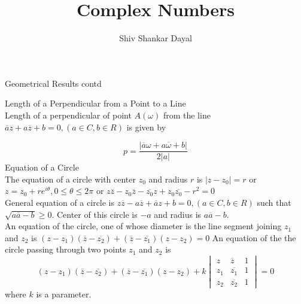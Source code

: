 \documentclass[aspectratio=169,8pt]{beamer}
\title{Complex Numbers}
\author[Shiv Shankar Dayal]{Shiv Shankar Dayal}
\begin{document}
\begin{frame}
  \titlepage
\end{frame}
\begin{frame}[fragile]{Geometrical Results contd}

  {\large Length of a Perpendicular from a Point to a Line\\}
  \vspace*{0.2cm}
  Length of a perpendicular of point $A(\omega)$ from the line $\overline{a}z + a\overline{z} + b = 0, (a\in C, b\in R)$
  is given by

  $$p = \frac{|\overline{a}\omega + a\overline{\omega} + b|}{2|a|}$$
  {\large Equation of a Circle\\}
  \vspace*{0.2cm}
  The equation of a circle with center $z_0$ and radius $r$ is $|z- z_0| = r$ or $z = z_0 + re^{i\theta}, 0\leq \theta\leq 2\pi$ or
  $z\overline{z} - z_0\overline{z} - \overline{z_0}z + z_0\overline{z_0} - r^2 = 0$\\
  \vspace*{0.2cm}
  General equation of a circle is $z\overline{z} - a\overline{z} + \overline{a}z + b = 0, (a\in C, b\in R)$ such that $\sqrt{a\overline{a} - b}\geq 0.$
  Center of this circle is $-a$ and radius is $a\overline{a} - b.$\\
  \vspace*{0.2cm}
  An equation of the circle, one of whose diameter is the line segment joining $z_1$ and $z_2$ is $(z - z_1)(\overline{z} - \overline{z_2}) +
  (\overline{z} - \overline{z_1})(z - z_2) = 0$
  \vspace*{0.2cm}
  An equation of the the circle passing through two points $z_1$ and $z_2$ is
  $$(z - z_1)(\overline{z} - \overline{z_2}) + (\overline{z} - \overline{z_1})(z - z_2) + k \begin{vmatrix}z & \overline{z} & 1\\z_1 & \overline{z_1} & 1\\z_2 & \overline{z_2} & 1 \end{vmatrix} = 0$$
  where $k$ is a parameter.
\end{frame}
\end{document}
